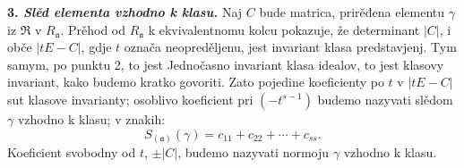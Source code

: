 \documentclass[11pt]{article}
\begin{document}
\setcounter{footnote}{26}

\textbf{3. \emph{Slěd elementa vzhodno k klasu.}} Naj $C$ bude matrica, prirěđena elementu $\gamma$ iz $\mathfrak R$ v $R_{\mathfrak a}$. Prěhod od $R_{\mathfrak a}$ k ekvivalentnomu kolcu pokazuje, že determinant $|C|$, i obče $|tE-C|$, gdje $t$ označa neopreděljenu, jest invariant klasa predstavjenj. Tym samym, po punktu 2, to jest Jednočasno invariant klasa idealov, to jest klasovy invariant, kako budemo kratko govoriti. Zato pojedine koeficienty po $t$ v $|tE-C|$ sut klasove invarianty; osoblivo koeficient pri $(-t^{s-1})$ budemo nazyvati slědom $\gamma$ vzhodno k klasu; v znakih:
\[
        S_{(\mathfrak a)}(\gamma)=c_{11}+c_{22}+\cdots+c_{ss}.
\]
Koeficient svobodny od $t$, $\pm |C|$, budemo nazyvati normoju $\gamma$ vzhodno k klasu.
\end{document}
